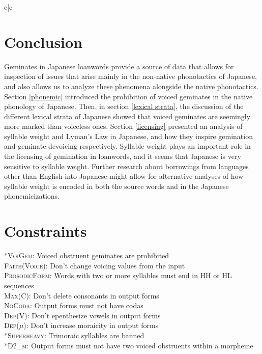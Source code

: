 \documentclass{article}
\begin{document}
\vspace{.25cm}

\begin{exe}
\ex
\label{t5}
\begin{tableau}{c|c}
  
   \vio{}      \vio{}            
               \vio{}    \vio{*!}          
\end{tableau}
\end{exe}

\vspace{.25cm}

\section{Conclusion}
\label{conclusion}

Geminates in Japanese loanwords provide a source of data that allows for inspection of issues that arise mainly in the non-native phonotactics of Japanese, and also allows us to analyze these phenomena alongside the native phonotactics. Section \ref{phonemic} introduced the prohibition of voiced geminates in the native phonology of Japanese. Then, in section \ref{lexical strata}, the discussion of the different lexical strata of Japanese showed that voiced geminates are seemingly more marked than voiceless ones. Section \ref{licensing} presented an analysis of syllable weight and Lyman's Law in Japanese, and how they inspire gemination and geminate devoicing respectively. Syllable weight plays an important role in the licensing of gemination in loanwords, and it seems that Japanese is very sensitive to syllable weight. Further research about borrowings from languages other than English into Japanese might allow for alternative analyses of how syllable weight is encoded in both the source words and in the Japanese phonemicizations.


\section{Constraints}
\label{Constraints}
\textsc{*VoiGem}: Voiced obstruent geminates are prohibited \\
\textsc{Faith(Voice)}: Don't change voicing values from the input \\
\textsc{ProsodicForm}: Words with two or more syllables must end in HH or HL sequences \\
\textsc{Max(C)}: Don't delete consonants in output forms\\
\textsc{NoCoda}: Output forms must not have codas \\
\textsc{Dep(V)}: Don't epenthesize vowels in output forms \\
\textsc{Dep($\mu$)}: Don't increase moraicity in output forms \\
\textsc{*Superheavy}: Trimoraic syllables are banned \\
\textsc{*D2_{m}}: Output forms must not have two voiced obstruents within a morpheme



\end{document}
